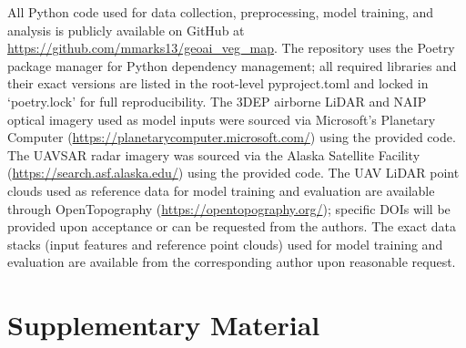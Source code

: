 \documentclass[12pt]{report}
\begin{document}
All Python code used for data collection, preprocessing, model training, and analysis is publicly available on GitHub at \url{https://github.com/mmarks13/geoai\_veg\_map}. The repository uses the Poetry package manager for Python dependency management; all required libraries and their exact versions are listed in the root-level pyproject.toml and locked in `poetry.lock' for full reproducibility. The 3DEP airborne LiDAR and NAIP optical imagery used as model inputs were sourced via Microsoft's Planetary Computer (\url{https://planetarycomputer.microsoft.com/}) using the provided code. The UAVSAR radar imagery was sourced via the Alaska Satellite Facility (\url{https://search.asf.alaska.edu/}) using the provided code. The UAV LiDAR point clouds used as reference data for model training and evaluation are available through OpenTopography (\url{https://opentopography.org/}); specific DOIs will be provided upon acceptance or can be requested from the authors. The exact data stacks (input features and reference point clouds) used for model training and evaluation are available from the corresponding author upon reasonable request.

\appendix
\chapter{Supplementary Material}
\label{app1}
\chapterstart
\vspace{-0.9cm}
\end{document}
